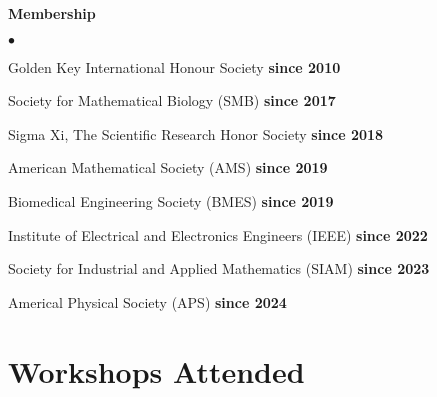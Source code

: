 \documentclass[margin,line]{res}
\newenvironment{list2}{
  \begin{list}{$\bullet$}{
      \setlength{\itemsep}{0in}
      \setlength{\parsep}{0in} \setlength{\parskip}{0in}
      \setlength{\topsep}{0in} \setlength{\partopsep}{0in}
      \setlength{\leftmargin}{0.2in}}}{\end{list}}
\begin{document}
\begin{resume}
\textbf{Membership}
\vspace*{.2cm}
\begin{list2}
\itemindent=-13pt
\setlength\itemsep{0.4em}
\item[] Golden Key International Honour Society \hfill {\bf \small since 2010}
\item[] Society for Mathematical Biology (SMB) \hfill {\bf \small since 2017}
\item[] Sigma Xi, The Scientific Research Honor Society \hfill {\bf \small since 2018}
\item[] American Mathematical Society (AMS) \hfill {\bf \small since 2019}
\item[] Biomedical Engineering Society (BMES) \hfill {\bf \small since 2019}
\item[] Institute of Electrical and Electronics Engineers (IEEE) \hfill {\bf \small since 2022}
\item[] Society for Industrial and Applied Mathematics (SIAM) \hfill {\bf \small since 2023} 
\item[] Americal Physical Society (APS) \hfill {\bf \small since 2024}  
\end{list2}

\section{\sc Workshops Attended}


\end{resume}
\end{document}
